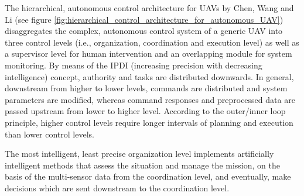 %


The hierarchical, autonomous control architecture for UAVs by Chen, Wang and Li \cite{Chen2009} (see figure \ref{fig:hierarchical_control_architecture_for_autonomous_UAV})
disaggregates the complex, autonomous control system of a generic UAV into three control levels (i.e., organization, coordination and execution level)
as well as a supervisor level for human intervention and an overlapping module for system monitoring.
By means of the IPDI (increasing precision with decreasing intelligence) concept, authority and tasks are distributed downwards.
In general, downstream from higher to lower levels, commands are distributed and system parameters are modified,
whereas command responses and preprocessed data are passed upstream from lower to higher level.
According to the outer/inner loop principle, higher control levels require longer intervals of planning and execution than lower control levels.

The most intelligent, least precise organization level implements artificially intelligent methods
that assess the situation and manage the mission, on the basis of the multi-sensor data from the coordination level,
and eventually, make decisions which are sent downstream to the coordination level.


